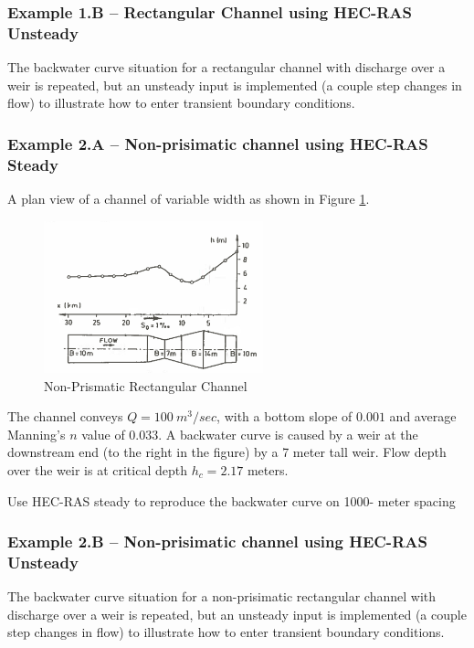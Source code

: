 \subsubsection{Example 1.B -- Rectangular Channel using HEC-RAS Unsteady}
The backwater curve situation for a rectangular channel with discharge over a weir is repeated, but an unsteady input is implemented (a couple step changes in flow) to illustrate how to enter transient boundary conditions.

\subsubsection{Example 2.A -- Non-prisimatic channel using HEC-RAS Steady}
A plan view of a  channel of variable width as shown in Figure \ref{fig:NonPrismaticExample}.\\

\begin{figure}[h!] %
   \centering
   \includegraphics[width=2.5in]{NonPrismaticExample} 
   \caption{Non-Prismatic Rectangular Channel}
   \label{fig:NonPrismaticExample}
\end{figure}

The channel conveys $Q=100~m^3/sec$, with a bottom slope of $0.001$ and average Manning's $n$ value of $0.033$.  
A backwater curve is caused by a weir at the downstream end (to the right in the figure) by a 7 meter tall weir.
Flow depth over the weir is at critical depth $h_c = 2.17$ meters.    

Use HEC-RAS steady to reproduce the backwater curve on 1000- meter spacing

\subsubsection{Example 2.B -- Non-prisimatic channel using HEC-RAS Unsteady}
The backwater curve situation for a non-prisimatic rectangular channel with discharge over a weir is repeated, but an unsteady input is implemented (a couple step changes in flow) to illustrate how to enter transient boundary conditions.

